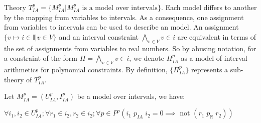 Theory $T^p_{IA} = \{M^p_{IA}| M^p_{IA} \text{ is a model over intervals}\}$. Each model differs to another by the mapping from variables to intervals. As a consequence, one assignment from variables to intervals can be used to describe an model. An assignment $\{v \mapsto i \in \mathbb{I} | v \in V\}$ and an interval constraint $\bigwedge\limits_{v \in V} v \in i$ are equivalent in terms of the set of assignments from variables to real numbers. So by abusing notation, for a constraint of the form $\Pi = \bigwedge\limits_{v \in V} v \in i$, we denote $\Pi^p_{IA}$ as a model of interval arithmetics for polynomial constraints. By definition, $\{\Pi^p_{IA}\}$ represents a sub-theory of $T^p_{IA}$.

\begin{lemma} \label{lemma:IA-R-OP}
Let $M^p_{IA} = (U^p_{IA}, I^p_{IA})$ be a model over intervals, we have:
\begin{center}
$\forall i_1, i_2 \in U^p_{IA}; \forall r_1 \in i_2, r_2 \in i_2; \forall p \in P^p (i_1 \; p_{IA} \; i_2 = 0 \implies \text{ not } (r_1 \; p_\mathbb{R} \; r_2))$
\end{center}
\end{lemma}

